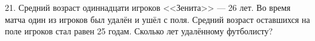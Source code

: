 21. Средний  возраст одиннадцати игроков <<Зенита>> --- 26 лет. Во время матча один из игроков был удалён и ушёл с поля. Средний возраст оставшихся на поле игроков стал равен 25 годам. Сколько лет удалённому футболисту?\\
